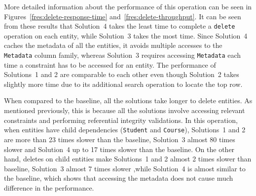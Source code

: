 





More detailed information about the performance of this operation can be seen in
Figures~\ref{fres:delete-response-time} and~\ref{fres:delete-throughput}.
It can be seen from these results that Solution~4 takes the least time to
complete a \texttt{delete} operation on each entity, while Solution~3 takes the
most time. Since Solution~4 caches the metadata of all the entities, it avoids
multiple accesses to the \texttt{Metadata} column family, whereas Solution~3
requires accessing \texttt{Metadata} each time a constraint has to be accessed
for an entity. The performance of Solutions~1 and 2 are comparable to each other
even though Solution~2 takes slightly more time due to its additional search
operation to locate the top row.



When compared to the baseline, all the solutions take longer to delete entities.
As mentioned previously, this is because all the solutions involve accessing
relevant constraints and performing referential integrity validations. In this
operation, when entities have child dependencies (\texttt{Student} and
\texttt{Course}), Solutions~1 and 2 are more than 23 times slower than the
baseline, Solution~3 almost 80 times slower and Solution~4   up to 17 times
slower than the baseline. On the other hand, deletes on child entities make
Solutions~1 and 2  almost 2 times slower than baseline, Solution~3  almost 7
times slower ,while Solution~4 is almost similar to the baseline, which shows
that accessing the metadata does not cause much difference in the performance.



